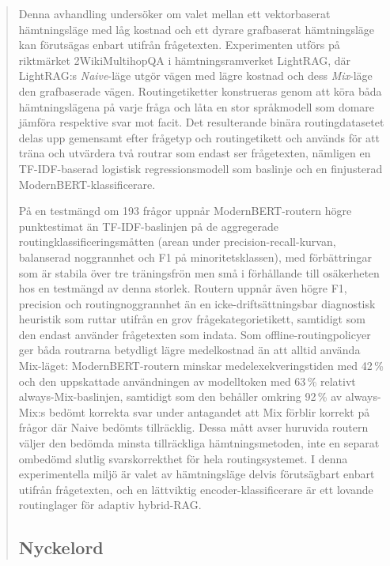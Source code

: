 \documentclass[english, bibtex]{kththesis}               %
\newcommand*{\sweExpl}[1]{\todo[inline, backgroundcolor=kth-lightblue40]{#1}}  %
\renewcommand\sweExpl[1]{}
\numberwithin{listing}{chapter}
\begin{document}
\begin{abstract}
\begin{scontents}[store-env=abstracts,print-env=true]
Denna avhandling undersöker om valet mellan ett vektorbaserat hämtningsläge med låg kostnad och ett dyrare grafbaserat hämtningsläge kan förutsägas enbart utifrån frågetexten. Experimenten utförs på riktmärket 2WikiMultihopQA i hämtningsramverket LightRAG, där LightRAG:s \emph{Naive}-läge utgör vägen med lägre kostnad och dess \emph{Mix}-läge den grafbaserade vägen. Routingetiketter konstrueras genom att köra båda hämtningslägena på varje fråga och låta en stor språkmodell som domare jämföra respektive svar mot facit. Det resulterande binära routingdatasetet delas upp gemensamt efter frågetyp och routingetikett och används för att träna och utvärdera två routrar som endast ser frågetexten, nämligen en TF-IDF-baserad logistisk regressionsmodell som baslinje och en finjusterad ModernBERT-klassificerare.

På en testmängd om 193 frågor uppnår ModernBERT-routern högre punktestimat än TF-IDF-baslinjen på de aggregerade routingklassificeringsmåtten (arean under precision-recall-kurvan, balanserad noggrannhet och F1 på minoritetsklassen), med förbättringar som är stabila över tre träningsfrön men små i förhållande till osäkerheten hos en testmängd av denna storlek. Routern uppnår även högre F1, precision och routingnoggrannhet än en icke-driftsättningsbar diagnostisk heuristik som ruttar utifrån en grov frågekategorietikett, samtidigt som den endast använder frågetexten som indata. Som offline-routingpolicyer ger båda routrarna betydligt lägre medelkostnad än att alltid använda Mix-läget: ModernBERT-routern minskar medelexekveringstiden med 42\,\% och den uppskattade användningen av modelltoken med 63\,\% relativt always-Mix-baslinjen, samtidigt som den behåller omkring 92\,\% av always-Mix:s bedömt korrekta svar under antagandet att Mix förblir korrekt på frågor där Naive bedömts tillräcklig. Dessa mått avser huruvida routern väljer den bedömda minsta tillräckliga hämtningsmetoden, inte en separat ombedömd slutlig svarskorrekthet för hela routingsystemet. I denna experimentella miljö är valet av hämtningsläge delvis förutsägbart enbart utifrån frågetexten, och en lättviktig encoder-klassificerare är ett lovande routinglager för adaptiv hybrid-RAG.
\end{scontents}
\subsection*{Nyckelord}
\begin{scontents}[store-env=keywords,print-env=true]
\end{scontents}
\sweExpl{Nyckelord som beskriver innehållet i uppsatsen eller rapporten}
\end{abstract}
\cleardoublepage
{}
\end{document}
